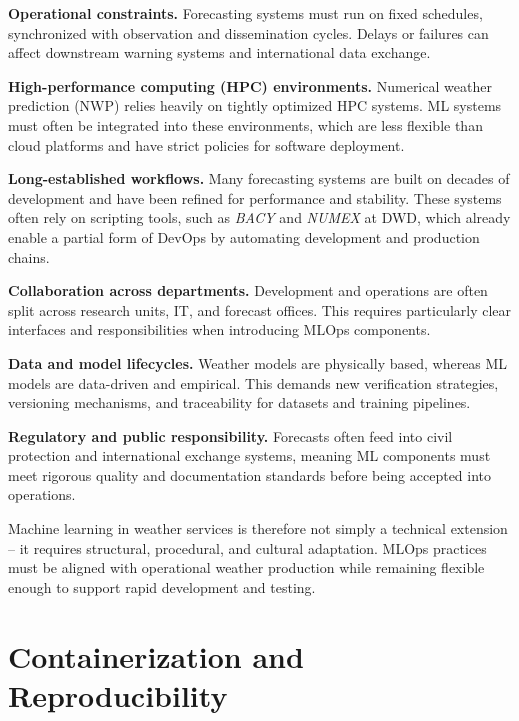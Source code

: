 {\bf Operational constraints.} Forecasting systems must run on fixed schedules, synchronized with observation and dissemination cycles. Delays or failures can affect downstream warning systems and international data exchange.

{\bf High-performance computing (HPC) environments.} Numerical weather prediction (NWP) relies heavily on tightly optimized HPC systems. ML systems must often be integrated into these environments, which are less flexible than cloud platforms and have strict policies for software deployment.

{\bf Long-established workflows.} Many forecasting systems are built on decades of development and have been refined for performance and stability. These systems often rely on scripting tools, such as {\em BACY} and {\em NUMEX} at DWD, which already enable a partial form of DevOps by automating development and production chains.

{\bf Collaboration across departments.} Development and operations are often split across research units, IT, and forecast offices. This requires particularly clear interfaces and responsibilities when introducing MLOps components.

{\bf Data and model lifecycles.} Weather models are physically based, whereas ML models are data-driven and empirical. This demands new verification strategies, versioning mechanisms, and traceability for datasets and training pipelines.

{\bf Regulatory and public responsibility.} Forecasts often feed into civil protection and international exchange systems, meaning ML components must meet rigorous quality and documentation standards before being accepted into operations.

Machine learning in weather services is therefore not simply a technical extension -- it requires structural, procedural, and cultural adaptation. MLOps practices must be aligned with operational weather production while remaining flexible enough to support rapid development and testing.


%
\section{Containerization and Reproducibility}

%
